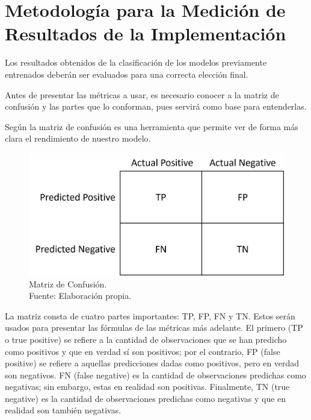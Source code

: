 \section{Metodología para la Medición de Resultados de la Implementación}

Los resultados obtenidos de la clasificación de los modelos previamente entrenados deberán ser evaluados para una correcta elección final. 

Antes de presentar las métricas a usar, es necesario conocer a la matriz de confusión y las partes que lo conforman, pues servirá como base para entenderlas. 

Según \cite{ws_izco2018bdcp} la matriz de confusión es una herramienta que permite ver de forma más clara el rendimiento de nuestro modelo.

\begin{figure}[H]
	\begin{center}
		\includegraphics[width=1.00\textwidth]{3/figures/conf_matrix.jpg}
		\caption[Matriz de Confusión]{Matriz de Confusión. \\
		Fuente: Elaboración propia.}
		\label{3:fig302}
	\end{center}
\end{figure}

La matriz consta de cuatro partes importantes: TP, FP, FN y TN. Estos serán usados para presentar las fórmulas de las métricas más adelante. El primero (TP o true positive) se refiere a la cantidad de observaciones que se han predicho como positivos y que en verdad sí son positivos; por el contrario, FP (false positive) se refiere a aquellas predicciones dadas como positivos, pero en verdad son negativos. FN (false negative) es la cantidad de observaciones predichas como negativas; sin embargo, estas en realidad son positivas. Finalmente, TN (true negative) es la cantidad de observaciones predichas como negativas y que en realidad son también negativas.


